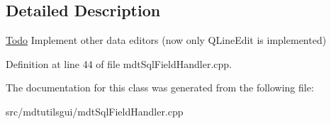 \subsection{Detailed Description}
\begin{Desc}
\item[\hyperlink{todo__todo000081}{Todo}]Implement other data editors (now only QLineEdit is implemented) \end{Desc}


Definition at line 44 of file mdtSqlFieldHandler.cpp.



The documentation for this class was generated from the following file:\begin{DoxyCompactItemize}
\item 
src/mdtutilsgui/mdtSqlFieldHandler.cpp\end{DoxyCompactItemize}

